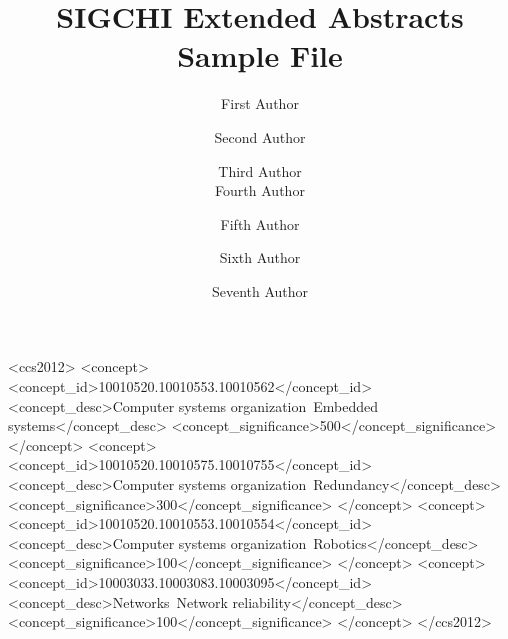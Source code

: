 \documentclass[sigchi-a, authorversion]{acmart}
\begin{document}
\title{SIGCHI Extended Abstracts Sample File}

\author{First Author}

\author{Second Author}

\author{Third Author \\
  Fourth Author}

\author{Fifth Author}

\author{Sixth Author}

\author{Seventh Author}

\renewcommand{\shortauthors}{F. Author et. al.}


%
%
\begin{CCSXML}
<ccs2012>
 <concept>
  <concept_id>10010520.10010553.10010562</concept_id>
  <concept_desc>Computer systems organization~Embedded systems</concept_desc>
  <concept_significance>500</concept_significance>
 </concept>
 <concept>
  <concept_id>10010520.10010575.10010755</concept_id>
  <concept_desc>Computer systems organization~Redundancy</concept_desc>
  <concept_significance>300</concept_significance>
 </concept>
 <concept>
  <concept_id>10010520.10010553.10010554</concept_id>
  <concept_desc>Computer systems organization~Robotics</concept_desc>
  <concept_significance>100</concept_significance>
 </concept>
 <concept>
  <concept_id>10003033.10003083.10003095</concept_id>
  <concept_desc>Networks~Network reliability</concept_desc>
  <concept_significance>100</concept_significance>
 </concept>
</ccs2012>  
\end{CCSXML}
\end{document}
